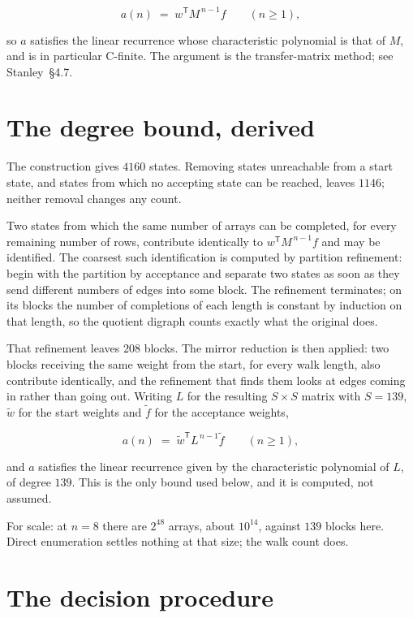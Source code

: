 \documentclass[11pt]{article}
\theoremstyle{definition}
\begin{document}
\[a(n) \;=\; w^{\mathsf T} M^{\,n-1} f \qquad (n \ge 1),\]

so $a$ satisfies the linear recurrence whose characteristic polynomial is that of $M$, and is in particular C-finite. The argument is the transfer-matrix method; see Stanley~\S4.7.

\section{The degree bound, derived}

The construction gives $4160$ states. Removing states unreachable from a start state, and states from which no accepting state can be reached, leaves $1146$; neither removal changes any count.

Two states from which the same number of arrays can be completed, for every remaining number of rows, contribute identically to $w^{\mathsf T}M^{\,n-1}f$ and may be identified. The coarsest such identification is computed by partition refinement: begin with the partition by acceptance and separate two states as soon as they send different numbers of edges into some block. The refinement terminates; on its blocks the number of completions of each length is constant by induction on that length, so the quotient digraph counts exactly what the original does.

That refinement leaves $208$ blocks. The mirror reduction is then applied: two blocks receiving the same weight from the start, for every walk length, also contribute identically, and the refinement that finds them looks at edges coming in rather than going out. Writing $L$ for the resulting $S \times S$ matrix with $S = 139$, $\tilde w$ for the start weights and $\tilde f$ for the acceptance weights,

\[a(n) \;=\; \tilde w^{\mathsf T} L^{\,n-1} \tilde f \qquad (n \ge 1),\]

and $a$ satisfies the linear recurrence given by the characteristic polynomial of $L$, of degree $139$. This is the only bound used below, and it is computed, not assumed.

For scale: at $n = 8$ there are $2^{48}$ arrays, about $10^{14}$, against $139$ blocks here. Direct enumeration settles nothing at that size; the walk count does.

\section{The decision procedure}
\end{document}
